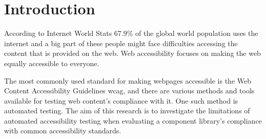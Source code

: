 \documentclass{master_thesis}
\begin{document}
\section{Introduction} \label{chap:intro}




According to Internet World Stats 67.9\% of the global world population uses the internet \citep{MMG2023} and a big part of these people might face difficulties accessing the content that is provided on the web. Web accessibility focuses on making the web equally accessible to everyone.


The most commonly used standard for making webpages accessible is the Web Content Accessibility Guidelines \ac{wcag}, and there are various methods and tools available for testing web content's compliance with it. One such method is automated testing. The aim of this research is to investigate the limitations of automated accessibility testing when evaluating a component library's compliance with common accessibility standards.


\end{document}
